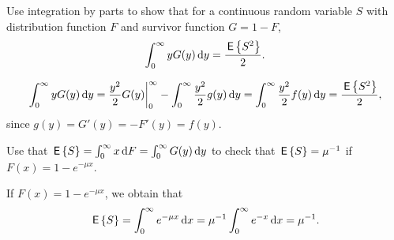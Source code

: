 \begin{exercise}
 Use integration by parts to show that for  a continuous random
    variable $S$ with distribution function $F$ and survivor function $G=1-F$, 
\begin{equation*}
\int_0^\infty y G(y) \,\text{d}y = \frac{\,\mathsf{E}\left\{S^2\right\}}2.
\end{equation*}
\begin{solution}
  \begin{equation}
      \int_0^\infty y G(y) \,\text{d}y 
= \frac{y^2}2 G(y) \bigg|_0^\infty  - \int_0^\infty \frac{y^2}2 g(y)\,\text{d}y = \int_0^\infty \frac{y^2}2 f(y)\,\text{d}y = \frac{\,\mathsf{E}\left\{S^2\right\}}2,
  \end{equation}
  since $g(y) = G'(y) = - F'(y) = f(y)$.
\end{solution}
\end{exercise}

\begin{exercise}
  Use that $\,\mathsf{E}\left\{S\right\} = \int_0^\infty x \,\text{d}F = \int_0^\infty G(y) \,\text{d}y$ to
  check that  $\,\mathsf{E}\left\{S\right\} = \mu^{-1}$ if $F(x) = 1 - e^{-\mu x}$.
\begin{solution}
If $F(x) = 1 - e^{-\mu x}$, we obtain that 
\begin{equation*}
  \,\mathsf{E}\left\{S\right\} = \int_0^\infty e^{-\mu x} \,\text{d}x =
  \mu^{-1}\int_0^\infty e^{-x} \,\text{d}x = \mu^{-1}.
\end{equation*}
\end{solution}
\end{exercise}


